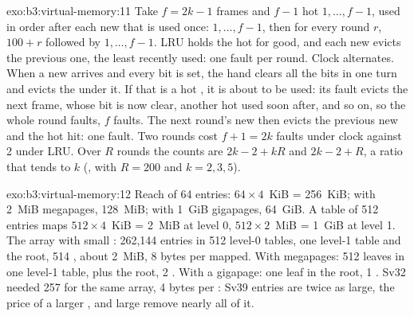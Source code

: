 \begin{solution}{exo:b3:virtual-memory:11}
Take $f = 2k - 1$ frames and $f - 1$ hot  $1, \dots, f - 1$, used in order after each new  that is used once: $1, \dots, f - 1$, then for every round $r$,  $100 + r$ followed by $1, \dots, f - 1$. LRU holds the hot  for good, and each new  evicts the previous one, the least recently used: one fault per round. Clock alternates. When a new  arrives and every bit is set, the hand clears all the bits in one turn and evicts the  under it. If that is a hot , it is about to be used: its fault evicts the next frame, whose bit is now clear, another hot  used soon after, and so on, so the whole round faults, $f$ faults. The next round's new  then evicts the previous new  and the hot  hit: one fault. Two rounds cost $f + 1 = 2k$ faults under clock against 2 under LRU. Over $R$ rounds the counts are $2k - 2 + kR$ and $2k - 2 + R$, a ratio that tends to $k$ (, with $R = 200$ and $k = 2, 3, 5$).
\end{solution}

\begin{solution}{exo:b3:virtual-memory:12}
Reach of 64 entries: $64 \times 4$~KiB = 256~KiB; with 2~MiB megapages, 128~MiB; with 1~GiB gigapages, 64~GiB. A table of 512 entries maps $512 \times 4$~KiB = 2~MiB at level 0, $512 \times 2$~MiB = 1~GiB at level 1. The array with small : 262,144 entries in 512 level-0 tables, one level-1 table and the root, 514 , about 2~MiB, 8 bytes per  mapped. With megapages: 512 leaves in one level-1 table, plus the root, 2 . With a gigapage: one leaf in the root, 1 . Sv32 needed 257  for the same array, 4 bytes per : Sv39 entries are twice as large, the price of a larger , and large  remove nearly all of it.
\end{solution}

